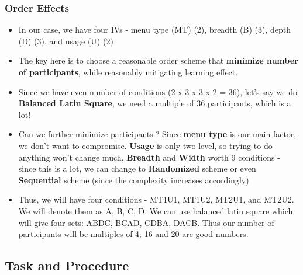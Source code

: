 \documentclass{beamer}
\begin{document}
\begin{frame}
	\footnotesize
	\frametitle{Order Effects}
	\begin{itemize}
		\item In our case, we have four IVs - menu type (MT) (2), breadth (B) (3), depth (D) (3), and usage (U) (2)
		\item The key here is to choose a reasonable order scheme that \textbf{minimize number of participants}, while reasonably mitigating learning effect.
		\item Since we have even number of conditions (2 x 3 x 3 x 2 = 36),  let's say we do \textbf{Balanced Latin Square},  we need a multiple of 36 participants,  which is a lot!
		\item Can we further minimize participants.?  Since \textbf{menu type} is our main factor, we don't want to compromise.  \textbf{Usage} is only two level,  so trying to do anything won't change much.   \textbf{Breadth} and \textbf{Width} worth 9 conditions - since this is a lot, we can change to \textbf{Randomized} scheme or even \textbf{Sequential} scheme (since the complexity increases accordingly)
		\item Thus, we will have four conditions - MT1U1, MT1U2, MT2U1, and MT2U2.  We will denote them as A, B, C, D.   We can use balanced latin square which will give four sets: {ABDC, BCAD, CDBA, DACB}.  Thus our number of participants will be multiples of 4;  16 and 20 are good numbers.
	\end{itemize}
\end{frame}

\subsection{Task and Procedure}
\end{document}

